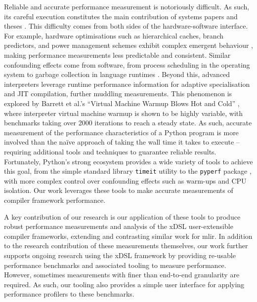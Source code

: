 Reliable and accurate performance measurement is notoriously difficult.
As such, its careful execution constitutes the main contribution of systems papers and theses \cite{crapeperformance} \cite{harris2021understanding}.
This difficulty comes from both sides of the hardware-software interface.
For example, hardware optimisations such as hierarchical caches, branch predictors, and power management schemes exhibit complex emergent behaviour \cite{hennessyComputerArchitectureQuantitative2012}, making performance measurements less predictable and consistent. Similar confounding effects come from software, from process scheduling in the operating system to garbage collection in language runtimes \cite{blackburnMythsRealitiesPerformance2004}.
Beyond this, advanced interpreters leverage runtime performance information for adaptive specialisation and JIT compilation, further muddling measurements. This phenomenon is explored by Barrett et al.'s ``Virtual Machine Warmup Blows Hot and Cold'' \cite{barrettVirtualMachineWarmup2017}, where interpreter virtual machine warmup is shown to be highly variable, with benchmarks taking over 2000 iterations to reach a steady state.
As such, accurate measurement of the performance characteristics of a Python program is more involved than the na\"ive approach of taking the wall time it takes to execute -- requiring additional tools and techniques to guarantee reliable results.
Fortunately, Python's strong ecosystem provides a wide variety of tools to achieve this goal, from the simple standard library \texttt{timeit} utility \cite{pythonsoftwarefoundationTimeitMeasureExecution} to the \texttt{pyperf} package \cite{victorstinnerPsfPyperf2025}, with more complex control over confounding effects such as warm-ups and CPU isolation.
Our work leverages these tools to make accurate measurements of compiler framework performance.

A key contribution of our research is our application of these tools to produce robust performance measurements and analysis of the xDSL user-extensible compiler frameworks, extending and contrasting similar work for \ac{mlir}.
In addition to the research contribution of these measurements themselves, our work further supports ongoing research using the xDSL framework by providing re-usable performance benchmarks and associated tooling to measure performance.
However, sometimes measurements with finer than end-to-end granularity are required. As such, our tooling also provides a simple user interface for applying performance profilers to these benchmarks.



